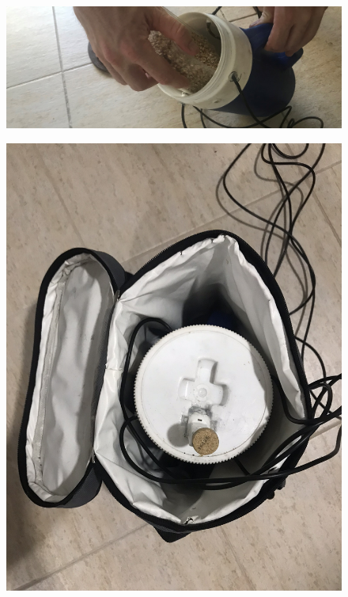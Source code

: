     \begin{figure}
        \centering
        \includegraphics[scale=0.10]{Anexo/FotosExperimentos/P4.jpg}
        \label{fig:IncorpInsumos}
    \end{figure}
    
    \begin{figure}
        \centering
        \includegraphics[scale=0.10]{Anexo/FotosExperimentos/P5.jpeg}
        \label{fig:ConstrucAislamTerm}
    \end{figure}
    
